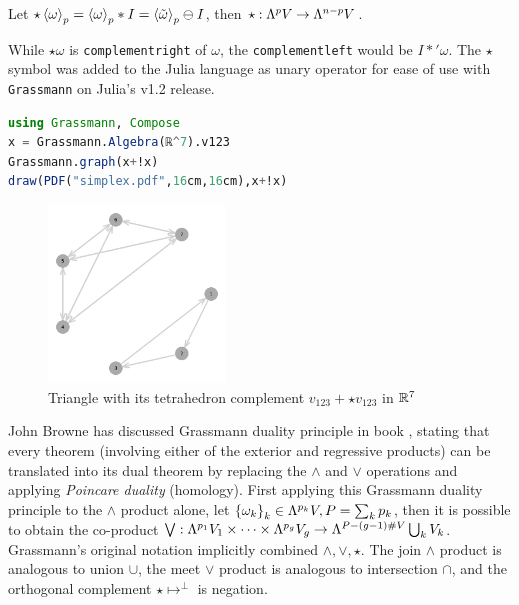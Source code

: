 \documentclass{juliacon}
\begin{document}
\begin{definition}
	Let $\star\left\langle \omega \right\rangle_p = \left\langle \omega \right\rangle_p\ast I = \left\langle \tilde\omega \right\rangle_p\ominus I$, %
	 then $\star : \Lambda^pV\rightarrow\Lambda^{n-p}V$.
\end{definition}
\begin{remark}
	While $\star\omega$ is \verb`complementright` of $\omega$, the \verb`complementleft` would be $I\ast'\omega$. The $\star$ symbol was added to the Julia language as unary operator for ease of use with \verb`Grassmann` on Julia's v1.2 release.
\end{remark}
\begin{lstlisting}[language = Julia]
using Grassmann, Compose
x = Grassmann.Algebra(ℝ^7).v123
Grassmann.graph(x+!x)
draw(PDF("simplex.pdf",16cm,16cm),x+!x)
\end{lstlisting}
\begin{figure}[ht]
\centerline{\includegraphics[width=0.42\textwidth]{img/triangle-tetrahedron.png}}
\caption*{Triangle with its tetrahedron complement $v_{123} + \star v_{123}$ in $\mathbb{R}^7$}
\end{figure}
John Browne has discussed Grassmann duality principle in book \cite{browne}, stating that every theorem (involving either of the exterior and regressive products) can be translated into its dual theorem by replacing the $\wedge$ and $\vee$ operations and applying \textit{Poincare duality} (homology).
First applying this Grassmann duality principle to the $\wedge$ product alone, let $\left\{ \omega_k \right\}_k\in\Lambda^{p_k}V, P=\sum_kp_k$, then it is possible to obtain the co-product
$\bigvee :\Lambda^{p_1}V_1\times\dots\times\Lambda^{p_g}V_g \rightarrow \Lambda^{P-(g-1)\#V}\bigcup_k V_k$.
Grassmann's original notation implicitly combined $\wedge,\vee,\star$.
The join $\wedge$ product is analogous to union $\cup$, the meet $\vee$ product is analogous to intersection $\cap$, and the orthogonal complement $\star\mapsto^\perp$ is negation.
\end{document}
